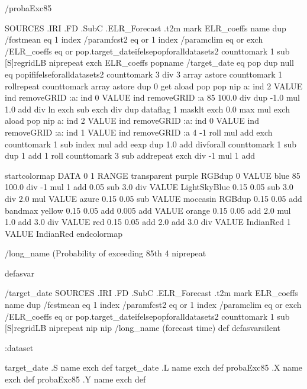 \begin{ingrid}
/probaExc85 {
 SOURCES .IRI .FD .SubC .ELR_Forecast .t2m
  mark ELR_coeffs {name dup /fcstmean eq 1 index /paramfcst2 eq or 1 index /paramclim eq or exch /ELR_coeffs eq or {pop}{.target_date}ifelse}{pop}foralldatasets2
      counttomark
       1 sub
       {[S]regridLB nip}repeat
    exch
    ELR_coeffs {pop}{name /target_date eq {pop}{ dup null eq {pop}if}ifelse}foralldatasets2 counttomark
              3 div
              {3 array astore counttomark 1 roll}repeat
       counttomark array astore
     dup
      0 get
      aload pop
        pop
       nip a:
        ind 2 VALUE
        ind removeGRID
        :a:
         ind 0 VALUE
         ind removeGRID
         :a
       85
        100.0 div
        dup
         -1.0 mul
         1.0 add
         div
        ln exch sub
       exch div
      dup dataflag
       1 masklt
       exch
       0.0 max
       mul
      exch
      {aload pop nip a: ind 2 VALUE ind removeGRID :a: ind 0 VALUE ind removeGRID :a: ind 1 VALUE ind removeGRID :a 4 -1 roll mul add exch counttomark 1 sub index mul add eexp dup 1.0 add div}forall counttomark
         1 sub
         dup
          1 add
          1 roll
         counttomark
          3 sub
          {add}repeat
       exch div
      -1 mul
      1 add

startcolormap DATA 0 1 RANGE transparent purple RGBdup 0 VALUE blue 85  100.0 div -1 mul 1 add  0.05 sub 3.0 div VALUE LightSkyBlue 0.15 0.05 sub 3.0 div 2.0 mul VALUE azure 0.15 0.05 sub VALUE moccasin RGBdup 0.15 0.05 add bandmax yellow 0.15 0.05 add 0.005 add VALUE orange 0.15 0.05 add 2.0 mul 1.0 add 3.0 div VALUE red 0.15 0.05 add 2.0 add 3.0 div VALUE IndianRed 1 VALUE IndianRed endcolormap

     /long_name (Probability of exceeding 85th %
      4 {nip}repeat
}defasvar

/target_date {
 SOURCES .IRI .FD .SubC .ELR_Forecast .t2m
  mark ELR_coeffs {name dup /fcstmean eq 1 index /paramfcst2 eq or 1 index /paramclim eq or exch /ELR_coeffs eq or {pop}{.target_date}ifelse}{pop}foralldatasets2
      counttomark
       1 sub
       {[S]regridLB nip}repeat
    nip nip
/long_name (forecast time) def
}defasvarsilent

:dataset

target_date .S name exch def
target_date .L name exch def
probaExc85 .X name exch def
probaExc85 .Y name exch def

\end{ingrid}
